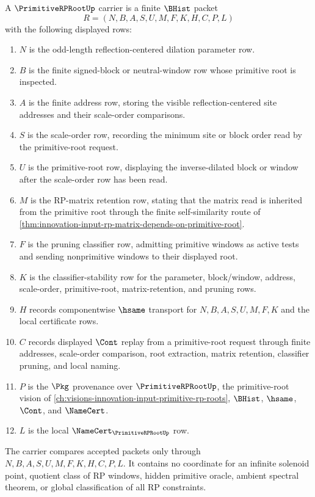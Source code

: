 \begin{definition}
\label{def:primitive-rp-root-carrier}
A $\PrimitiveRPRootUp$ carrier is a finite $\BHist$ packet
$$
R=(N,B,A,S,U,M,F,K,H,C,P,L)
$$
with the following displayed rows:
\begin{enumerate}
\item $N$ is the odd-length reflection-centered dilation parameter row.
\item $B$ is the finite signed-block or neutral-window row whose primitive root is inspected.
\item $A$ is the finite address row, storing the visible reflection-centered site addresses and their scale-order comparisons.
\item $S$ is the scale-order row, recording the minimum site or block order read by the primitive-root request.
\item $U$ is the primitive-root row, displaying the inverse-dilated block or window after the scale-order row has been read.
\item $M$ is the RP-matrix retention row, stating that the matrix read is inherited from the primitive root through the finite self-similarity route of \autoref{thm:innovation-input-rp-matrix-depends-on-primitive-root}.
\item $F$ is the pruning classifier row, admitting primitive windows as active tests and sending nonprimitive windows to their displayed root.
\item $K$ is the classifier-stability row for the parameter, block/window, address, scale-order, primitive-root, matrix-retention, and pruning rows.
\item $H$ records componentwise $\hsame$ transport for $N,B,A,S,U,M,F,K$ and the local certificate rows.
\item $C$ records displayed $\Cont$ replay from a primitive-root request through finite addresses, scale-order comparison, root extraction, matrix retention, classifier pruning, and local naming.
\item $P$ is the $\Pkg$ provenance over $\PrimitiveRPRootUp$, the primitive-root vision of \autoref{ch:visions-innovation-input-primitive-rp-roots}, $\BHist$, $\hsame$, $\Cont$, and $\NameCert$.
\item $L$ is the local $\NameCert_{\PrimitiveRPRootUp}$ row.
\end{enumerate}
The carrier compares accepted packets only through $N,B,A,S,U,M,F,K,H,C,P,L$. It contains no coordinate for an infinite solenoid point, quotient class of RP windows, hidden primitive oracle, ambient spectral theorem, or global classification of all RP constraints.
\end{definition}

